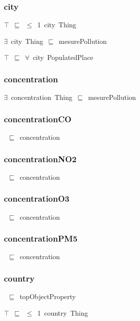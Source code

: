 \documentclass{article}
\begin{document}
\subsubsection*{city}

\ensuremath{\top}~\ensuremath{\sqsubseteq}~\ensuremath{\leq}~1~city~Thing

\ensuremath{\exists}~city~Thing~\ensuremath{\sqsubseteq}~mesurePollution

\ensuremath{\top}~\ensuremath{\sqsubseteq}~\ensuremath{\forall}~city~PopulatedPlace

\subsubsection*{concentration}

\ensuremath{\exists}~concentration~Thing~\ensuremath{\sqsubseteq}~mesurePollution

\subsubsection*{concentrationCO}

~\ensuremath{\sqsubseteq}~concentration

\subsubsection*{concentrationNO2}

~\ensuremath{\sqsubseteq}~concentration

\subsubsection*{concentrationO3}

~\ensuremath{\sqsubseteq}~concentration

\subsubsection*{concentrationPM5}

~\ensuremath{\sqsubseteq}~concentration

\subsubsection*{country}

~\ensuremath{\sqsubseteq}~topObjectProperty

\ensuremath{\top}~\ensuremath{\sqsubseteq}~\ensuremath{\leq}~1~country~Thing
\end{document}

